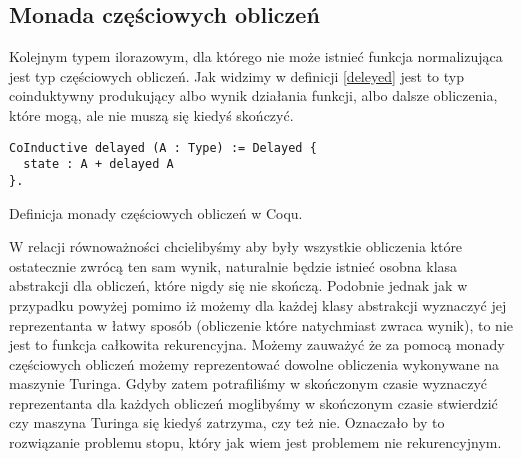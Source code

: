\subsection{Monada częściowych obliczeń}
Kolejnym typem ilorazowym, dla którego nie może istnieć funkcja normalizująca jest typ częściowych obliczeń. Jak widzimy w definicji \ref{deleyed} jest to typ coinduktywny produkujący albo wynik działania funkcji, albo dalsze obliczenia, które mogą, ale nie muszą się kiedyś skończyć.
\begin{code}
\begin{verbatim}
CoInductive delayed (A : Type) := Delayed {
  state : A + delayed A
}.
\end{verbatim}
\caption{Definicja monady częściowych obliczeń w Coqu.}
\label{deleyed}
\end{code}
W relacji równoważności chcielibyśmy aby były wszystkie obliczenia które ostatecznie zwrócą ten sam wynik, naturalnie będzie istnieć osobna klasa abstrakcji dla obliczeń, które nigdy się nie skończą. Podobnie jednak jak w przypadku powyżej pomimo iż możemy dla każdej klasy abstrakcji wyznaczyć jej reprezentanta w łatwy sposób (obliczenie które natychmiast zwraca wynik), to nie jest to funkcja całkowita rekurencyjna. Możemy zauważyć że za pomocą monady częściowych obliczeń możemy reprezentować dowolne obliczenia wykonywane na maszynie Turinga. Gdyby zatem potrafiliśmy w skończonym czasie wyznaczyć reprezentanta dla każdych obliczeń moglibyśmy w skończonym czasie stwierdzić czy maszyna Turinga się kiedyś zatrzyma, czy też nie. Oznaczało by to rozwiązanie problemu stopu, który jak wiem jest problemem nie rekurencyjnym. 

